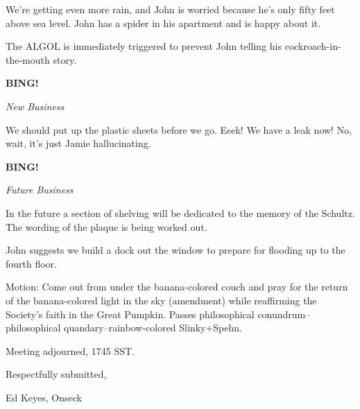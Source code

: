 \documentclass[12pt]{article}
\newcommand{\bing}{{\bf BING!} }
\newcommand{\goto}[1]{\bing \vskip 12pt \centerline{{\em{#1}}}}
\begin{document}
We're getting even more rain, and John is worried because he's only
fifty feet above sea level.  John has a spider in his apartment and
is happy about it.

The ALGOL is immediately triggered to prevent John telling his
cockroach-in-the-mouth story.

\goto{New Business}

We should put up the plastic sheets before we go.  Eeek!  We have a
leak now!  No, wait, it's just Jamie hallucinating.

\goto{Future Business}

In the future a section of shelving will be dedicated to the memory
of the Schultz.  The wording of the plaque is being worked out.

John suggests we build a dock out the window to prepare for flooding
up to the fourth floor.

Motion: Come out from under the banana-colored couch and pray for the
return of the banana-colored light in the sky (amendment) while
reaffirming the Society's faith in the Great Pumpkin.  Passes
philosophical conundrum--philosophical quandary--rainbow-colored
Slinky+Spehn.

\vspace{12pt}

\noindent
Meeting adjourned, 1745 SST.

\vspace{18pt}

\centerline{Respectfully submitted,}
\centerline{Ed Keyes, Onseck}
\end{document}
